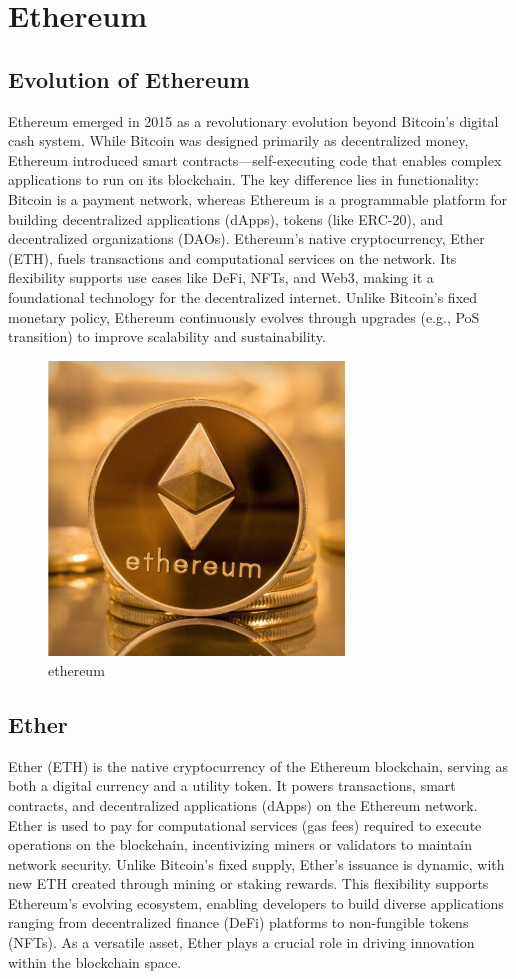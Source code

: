 \documentclass[12pt, a4paper]{article}
\begin{document}
\section{Ethereum}
\subsection{Evolution of Ethereum}
Ethereum emerged in 2015 as a revolutionary evolution beyond Bitcoin's digital cash system. While Bitcoin was designed primarily as decentralized money, Ethereum introduced smart contracts—self-executing code that enables complex applications to run on its blockchain. The key difference lies in functionality: Bitcoin is a payment network, whereas Ethereum is a programmable platform for building decentralized applications (dApps), tokens (like ERC-20), and decentralized organizations (DAOs). Ethereum's native cryptocurrency, Ether (ETH), fuels transactions and computational services on the network. Its flexibility supports use cases like DeFi, NFTs, and Web3, making it a foundational technology for the decentralized internet. Unlike Bitcoin's fixed monetary policy, Ethereum continuously evolves through upgrades (e.g., PoS transition) to improve scalability and sustainability.
\begin{figure}[h]
    \centering
    \includegraphics[width=0.7\textwidth]{ethereum.png}
    \caption{ethereum}
    \label{fig:ethereum_example}
\end{figure}
\subsection{Ether}
Ether (ETH) is the native cryptocurrency of the Ethereum blockchain, serving as both a digital currency and a utility token. It powers transactions, smart contracts, and decentralized applications (dApps) on the Ethereum network. Ether is used to pay for computational services (gas fees) required to execute operations on the blockchain, incentivizing miners or validators to maintain network security. Unlike Bitcoin's fixed supply, Ether's issuance is dynamic, with new ETH created through mining or staking rewards. This flexibility supports Ethereum's evolving ecosystem, enabling developers to build diverse applications ranging from decentralized finance (DeFi) platforms to non-fungible tokens (NFTs). As a versatile asset, Ether plays a crucial role in driving innovation within the blockchain space.
\end{document}
